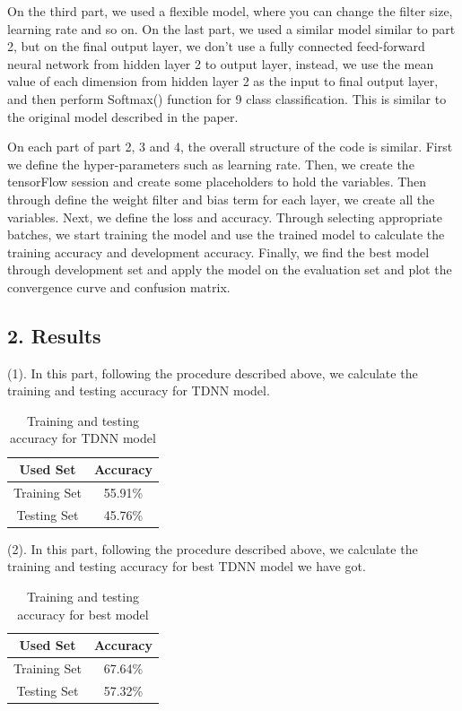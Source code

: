 On the third part, we used a flexible model, where you can change the filter size, learning rate and so on. On the last part, we used a similar model similar to part 2, but on the final output layer, we don't use a fully connected feed-forward neural network from hidden layer 2 to output layer, instead, we use the mean value of each dimension from hidden layer 2 as the input to final output layer, and then perform Softmax() function for 9 class classification. This is similar to the original model described in the paper.

On each part of part 2, 3 and 4, the overall structure of the code is similar. First we define the hyper-parameters such as learning rate. Then, we create the tensorFlow session and create some placeholders to hold the variables. Then through define the weight filter and bias term for each layer, we create all the variables. Next, we define the loss and accuracy. Through selecting appropriate batches, we start training the model and use the trained model to calculate the training accuracy and development accuracy. Finally, we find the best model through development set and apply the model on the evaluation set and plot the convergence curve and confusion matrix.

\subsection*{\large 2. Results}

(1). In this part, following the procedure described above, we calculate the training and testing accuracy for TDNN model. 

\begin{table}[H]
	\centering
	\caption{Training and testing accuracy for TDNN model}
	\label{table:TDNNacc}	
	\begin{tabular}{c | c}
		\hline \hline
		Used Set  		&	Accuracy \\[0.1cm]
		\hline
		Training Set	&	55.91\%	\\[0.1cm]
		Testing Set		&	45.76\%	\\[0.1cm]
		\hline	
	\end{tabular}
\end{table}


(2). In this part, following the procedure described above, we calculate the training and testing accuracy for best TDNN model we have got. 

\begin{table}[H]
	\centering
	\caption{Training and testing accuracy for best model}
	\label{table:BESTacc}	
	\begin{tabular}{c | c}
		\hline \hline
		Used Set  		&	Accuracy \\[0.1cm]
		\hline
		Training Set	&	67.64\%	\\[0.1cm]
		Testing Set		&	57.32\%	\\[0.1cm]
		\hline	
	\end{tabular}
\end{table}


